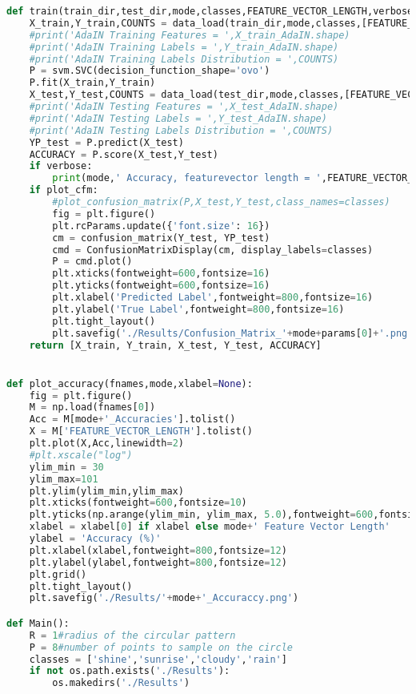 \documentclass{article}
\begin{document}
\begin{lstlisting}[language=Python]
def train(train_dir,test_dir,mode,classes,FEATURE_VECTOR_LENGTH,verbose=False,plot_cfm=False,params=['']):
	X_train,Y_train,COUNTS = data_load(train_dir,mode,classes,[FEATURE_VECTOR_LENGTH])
	#print('AdaIN Training Features = ',X_train_AdaIN.shape)
	#print('AdaIN Training Labels = ',Y_train_AdaIN.shape)
	#print('AdaIN Training Labels Distribution = ',COUNTS)
	P = svm.SVC(decision_function_shape='ovo')
	P.fit(X_train,Y_train)
	X_test,Y_test,COUNTS = data_load(test_dir,mode,classes,[FEATURE_VECTOR_LENGTH])
	#print('AdaIN Testing Features = ',X_test_AdaIN.shape)
	#print('AdaIN Testing Labels = ',Y_test_AdaIN.shape)
	#print('AdaIN Testing Labels Distribution = ',COUNTS)
	YP_test = P.predict(X_test)
	ACCURACY = P.score(X_test,Y_test)
	if verbose:
		print(mode,' Accuracy, featurevector length = ',FEATURE_VECTOR_LENGTH,',    ',mode,' Accuracy = ',np.round(ACCURACY*100,2),'%')
	if plot_cfm:
		#plot_confusion_matrix(P,X_test,Y_test,class_names=classes)
		fig = plt.figure()
		plt.rcParams.update({'font.size': 16})
		cm = confusion_matrix(Y_test, YP_test)
		cmd = ConfusionMatrixDisplay(cm, display_labels=classes)
		P = cmd.plot()
		plt.xticks(fontweight=600,fontsize=16)
		plt.yticks(fontweight=600,fontsize=16)
		plt.xlabel('Predicted Label',fontweight=800,fontsize=16)
		plt.ylabel('True Label',fontweight=800,fontsize=16)
		plt.tight_layout()
		plt.savefig('./Results/Confusion_Matrix_'+mode+params[0]+'.png')
	return [X_train, Y_train, X_test, Y_test, ACCURACY]


def plot_accuracy(fnames,mode,xlabel=None):
	fig = plt.figure()
	M = np.load(fnames[0])
	Acc = M[mode+'_Accuracies'].tolist()
	X = M['FEATURE_VECTOR_LENGTH'].tolist()
	plt.plot(X,Acc,linewidth=2)
	#plt.xscale("log")
	ylim_min = 30
	ylim_max=101
	plt.ylim(ylim_min,ylim_max)
	plt.xticks(fontweight=600,fontsize=10)
	plt.yticks(np.arange(ylim_min, ylim_max, 5.0),fontweight=600,fontsize=10)
	xlabel = xlabel[0] if xlabel else mode+' Feature Vector Length'
	ylabel = 'Accuracy (%)'
	plt.xlabel(xlabel,fontweight=800,fontsize=12)
	plt.ylabel(ylabel,fontweight=800,fontsize=12)
	plt.grid()
	plt.tight_layout()
	plt.savefig('./Results/'+mode+'_Accuraccy.png')

def Main():
	R = 1#radius of the circular pattern
	P = 8#number of points to sample on the circle
	classes = ['shine','sunrise','cloudy','rain']
	if not os.path.exists('./Results'):
		os.makedirs('./Results')


\end{lstlisting}
\end{document}
